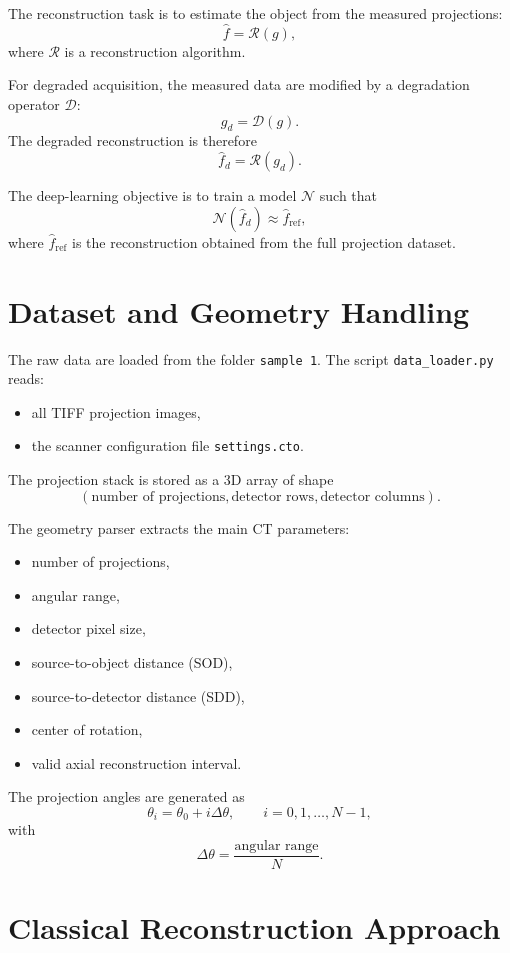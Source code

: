 \documentclass[12pt,a4paper]{article}
\begin{document}
The reconstruction task is to estimate the object from the measured projections:
\[
\hat{f} = \mathcal{R}(g),
\]
where $\mathcal{R}$ is a reconstruction algorithm.

For degraded acquisition, the measured data are modified by a degradation operator $\mathcal{D}$:
\[
g_d = \mathcal{D}(g).
\]
The degraded reconstruction is therefore
\[
\hat{f}_d = \mathcal{R}(g_d).
\]

The deep-learning objective is to train a model $\mathcal{N}$ such that
\[
\mathcal{N}(\hat{f}_d) \approx \hat{f}_{\text{ref}},
\]
where $\hat{f}_{\text{ref}}$ is the reconstruction obtained from the full projection dataset.

\section{Dataset and Geometry Handling}
The raw data are loaded from the folder \texttt{sample 1}. The script \texttt{data\_loader.py} reads:
\begin{itemize}[leftmargin=*]
\item all TIFF projection images,
\item the scanner configuration file \texttt{settings.cto}.
\end{itemize}

The projection stack is stored as a 3D array of shape
\[
(\text{number of projections}, \text{detector rows}, \text{detector columns}).
\]

The geometry parser extracts the main CT parameters:
\begin{itemize}[leftmargin=*]
\item number of projections,
\item angular range,
\item detector pixel size,
\item source-to-object distance (SOD),
\item source-to-detector distance (SDD),
\item center of rotation,
\item valid axial reconstruction interval.
\end{itemize}

The projection angles are generated as
\[
\theta_i = \theta_0 + i\Delta\theta,\qquad i=0,1,\dots,N-1,
\]
with
\[
\Delta\theta = \frac{\text{angular range}}{N}.
\]

\section{Classical Reconstruction Approach}
\end{document}
